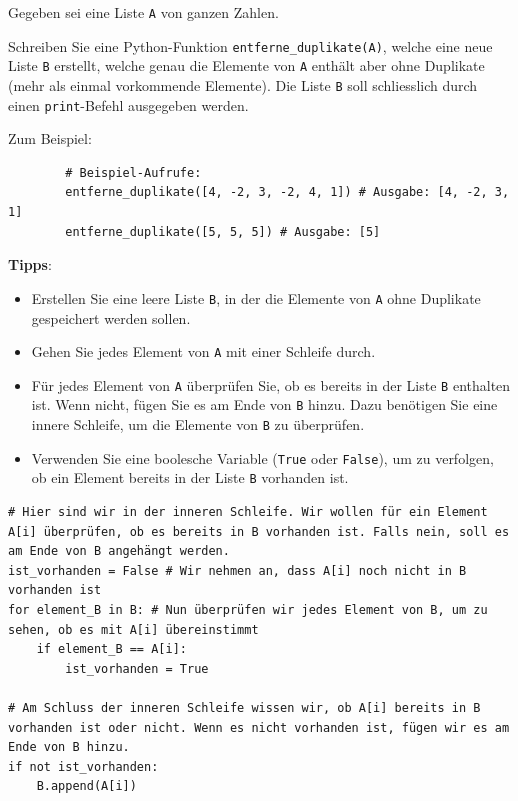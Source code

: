 \begin{myexercise}
	Gegeben sei eine Liste \texttt{A} von ganzen Zahlen.

	Schreiben Sie eine Python-Funktion \lstinline|entferne_duplikate(A)|, welche eine neue Liste \texttt{B} erstellt, welche genau die Elemente von \texttt{A} enthält aber ohne Duplikate (mehr als einmal vorkommende Elemente). Die Liste \texttt{B} soll schliesslich durch einen \lstinline|print|-Befehl ausgegeben werden.

	Zum Beispiel:
	\begin{lstlisting}
		# Beispiel-Aufrufe:
		entferne_duplikate([4, -2, 3, -2, 4, 1]) # Ausgabe: [4, -2, 3, 1]
		entferne_duplikate([5, 5, 5]) # Ausgabe: [5]
	\end{lstlisting}

	\textbf{Tipps}: %
	\begin{itemize}
		\item Erstellen Sie eine leere Liste \texttt{B}, in der die Elemente von \texttt{A} ohne Duplikate gespeichert werden sollen.
		\item Gehen Sie jedes Element von \texttt{A} mit einer Schleife durch.
		\item Für jedes Element von \texttt{A} überprüfen Sie, ob es bereits in der Liste \texttt{B} enthalten ist. Wenn nicht, fügen Sie es am Ende von \texttt{B} hinzu. Dazu benötigen Sie eine innere Schleife, um die Elemente von \texttt{B} zu überprüfen.
		\item Verwenden Sie eine boolesche Variable (\lstinline|True| oder \lstinline|False|), um zu verfolgen, ob ein Element bereits in der Liste \texttt{B} vorhanden ist.
	\end{itemize}
	\begin{minipage}{\textwidth}
		\begin{lstlisting}
# Hier sind wir in der inneren Schleife. Wir wollen für ein Element A[i] überprüfen, ob es bereits in B vorhanden ist. Falls nein, soll es am Ende von B angehängt werden.
ist_vorhanden = False # Wir nehmen an, dass A[i] noch nicht in B vorhanden ist
for element_B in B: # Nun überprüfen wir jedes Element von B, um zu sehen, ob es mit A[i] übereinstimmt
	if element_B == A[i]:
		ist_vorhanden = True

# Am Schluss der inneren Schleife wissen wir, ob A[i] bereits in B vorhanden ist oder nicht. Wenn es nicht vorhanden ist, fügen wir es am Ende von B hinzu.
if not ist_vorhanden:
	B.append(A[i])
		\end{lstlisting}
	\end{minipage}

	\begin{myanswer}
		
	\end{myanswer}
\end{myexercise}

